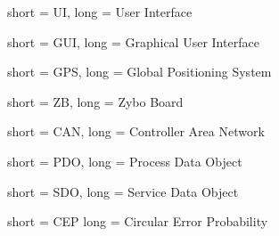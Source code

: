 {
	short = {UI},
	long = {User Interface}
}

{
	short = {GUI},
	long = {Graphical User Interface}
}

{
	short = {GPS},
	long = {Global Positioning System}
}

{
	short = {ZB},
	long = {Zybo Board}
}

{
	short = {CAN},
	long = {Controller Area Network}
}

{
	short = {PDO},
	long = {Process Data Object}
}

{
	short = {SDO},
	long = {Service Data Object}
}

{
	short = {CEP}
	long = {Circular Error Probability}
}

